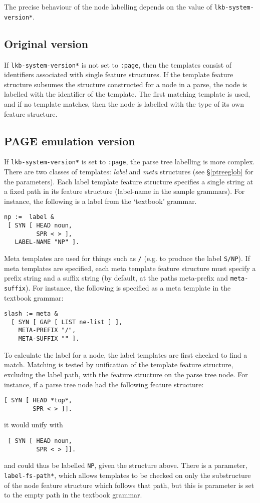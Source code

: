 \documentclass[12pt]{report}
\begin{document}
The precise behaviour of the node labelling depends on
the value of {\tt *lkb-system-version*}.  

\subsection{Original version}

If {\tt *lkb-system-version*} is not set to 
{\tt :page}, then the templates consist of identifiers 
associated with single feature
structures.  If the template feature structure subsumes the structure
constructed for a node in a parse, the node is labelled with the identifier
of the template.
The first matching template is used, and if no template matches,
then the node is labelled with the type of its own feature structure.

\subsection{PAGE emulation version}
If {\tt *lkb-system-version*} is set to 
{\tt :page}, the parse tree labelling is more complex.
There are two classes of templates: {\it label} and {\it meta}
structures (see \S\ref{ptreeglob} for the parameters).
Each label template feature structure specifies 
a single string at a fixed path in
its feature structure ({\sc label-name} in the sample grammars).
For instance, the following is a label from the `textbook' grammar.
\begin{verbatim}
np :=  label &
 [ SYN [ HEAD noun,
         SPR < > ],
   LABEL-NAME "NP" ].
\end{verbatim}
Meta templates are used for things such as {\tt /} (e.g. to produce
the label {\tt S/NP}).
If meta templates are specified,
each meta template feature structure must
specify a prefix string and a suffix string
(by default, at the paths {\sc meta-prefix} and {\tt meta-suffix}).  
For instance, the following is specified as a meta template in the textbook
grammar:
\begin{verbatim}
slash := meta &
  [ SYN [ GAP [ LIST ne-list ] ],
    META-PREFIX "/",
    META-SUFFIX "" ].
\end{verbatim}

To calculate the label for a 
node, the label templates are first checked to find a match.
Matching is tested by unification of the template feature
structure, excluding the label path, with the feature structure
on the parse tree node.
For instance, if a parse tree node had the following feature structure:
\begin{verbatim}
[ SYN [ HEAD *top*,
        SPR < > ]].
\end{verbatim}
it would unify with
\begin{verbatim}
 [ SYN [ HEAD noun,
         SPR < > ]].
\end{verbatim}
and could thus be labelled {\tt NP}, given the structure above.
There is a parameter, {\tt *label-fs-path*}, which allows
templates to be checked on only the substructure of the node
feature structure which follows that path, but
this is parameter is set to the empty path in the textbook grammar. 
\end{document}
